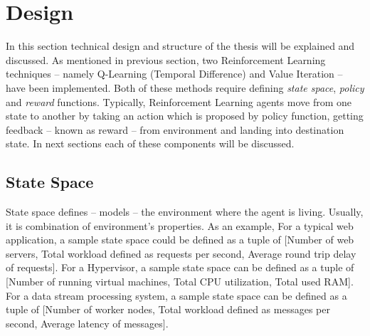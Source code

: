 \section{Design}
\label{des:proj}

In this section technical design and structure of the thesis will be explained and discussed. As mentioned in previous section, two Reinforcement Learning techniques -- namely Q-Learning (Temporal Difference) and Value Iteration -- have been implemented. Both of these methods require defining \emph{state space}, \emph{policy} and \emph{reward} functions. Typically, Reinforcement Learning agents move from one state to another by taking an action which is proposed by policy function, getting feedback -- known as reward -- from environment and landing into destination state. In next sections each of these components will be discussed.

\subsection{State Space}
\label{des:state-space}

State space defines -- models -- the environment where the agent is living. Usually, it is combination of environment's properties. As an example, For a typical web application, a sample state space could be defined as a tuple of [Number of web servers, Total workload defined as requests per second, Average round trip delay of requests]. For a Hypervisor, a sample state space can be defined as a tuple of [Number of running virtual machines, Total CPU utilization, Total used RAM]. For a data stream processing system, a sample state space can be defined as a tuple of [Number of worker nodes, Total workload defined as messages per second, Average latency of messages].

